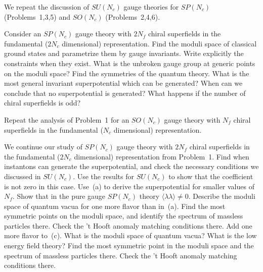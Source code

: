 
 

\def\shortseriestitle{DYNAMICS OF $N=1$ SUSY THEORIES}
\def\shortauthor{N. SEIBERG}
 \leftheadtext{\shortauthor, \shortseriestitle\unskip} 


   \topmatter
   \lecture{}
   \lecturename\endlecturename 
   \endtopmatter

\def\problemlabel{Problem }

We repeat the discussion of $SU(N_c)$ gauge theories for $SP(N_c)$
(Problems~1,3,5) and $SO(N_c)$ (Problems~2,4,6).

	\probsec Consider an $SP(N_c)$ gauge theory with $2N_f$ chiral
superfields in the fundamental ($2N_c$ dimensional) representation.
 \sec Find the moduli space of classical ground states and parametrize them
by gauge invariants.  Write explicitly the constraints when they exist.  What
is the unbroken gauge group at generic points on the moduli space?
 \sec Find the symmetries of the quantum theory.  What is the most general
invariant superpotential which can be generated?  When can we conclude
that no superpotential is generated?
 \sec What happens if the number of chiral superfields is odd?
	\endprobsec

	\problem
 Repeat the analysis of Problem~1 for an $SO(N_c)$ gauge theory with $N_f$
chiral superfields in the fundamental ($N_c$ dimensional) representation.
	\endproblem

	\probsec
 We continue our study of $SP(N_c)$ gauge theory with $2N_f$ chiral
superfields in the fundamental ($2N_c$ dimensional) representation from
Problem~1.
 \sec Find when instantons can generate the superpotential, and check the
necessary conditions we discussed in $SU(N_c)$.  Use the
results for $SU(N_c)$ to show that the coefficient is not zero in this
case.
 \sec Use~(a) to derive the superpotential for smaller values of $N_f$.  Show
that in the pure gauge $SP(N_c)$ theory $\langle \lambda \lambda \rangle
\not=0$.
 \sec Describe the moduli space of quantum vacua for one more flavor than
in~(a).  Find the most symmetric points on the moduli space, and identify the
spectrum of massless particles there.  Check the 't Hooft anomaly matching
conditions there.
 \sec Add one more flavor to~(c).  What is the moduli space of quantum
vacua?  What is the low energy field theory?  Find the most symmetric
point in the moduli space and the spectrum of massless particles
there.  Check the 't Hooft anomaly matching conditions there.
	\endprobsec

